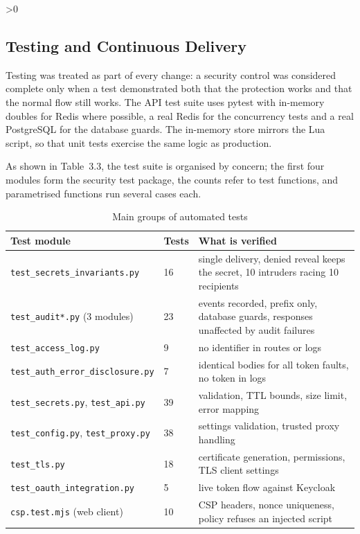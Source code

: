 \documentclass[12pt,a4paper]{article}
\numberwithin{equation}{section}
\numberwithin{figure}{section}
\numberwithin{table}{section}
\newcommand{\subsec}[1]{%
  \ifnum\value{subsection}>0\clearpage\fi
  \subsection{#1}%
}
\newcommand{\tablesetup}{\fontsize{11pt}{13pt}\selectfont\singlespacing\renewcommand{\arraystretch}{1.15}}
\newcommand{\leadin}[1]{%
  {\onehalfspacing\setlength{\parindent}{1.25cm}\indent #1\par}\vspace{8pt}}
\begin{document}
\subsec{Testing and Continuous Delivery}

Testing was treated as part of every change: a security control was considered complete only when a test demonstrated both that the protection works and that the normal flow still works. The API test suite uses pytest with in-memory doubles for Redis where possible, a real Redis for the concurrency tests and a real PostgreSQL for the database guards. The in-memory store mirrors the Lua script, so that unit tests exercise the same logic as production.

\begin{table}[H]
\leadin{As shown in Table~3.3, the test suite is organised by concern; the first four modules form the security test package, the counts refer to test functions, and parametrised functions run several cases each.}
\tablesetup
\caption{Main groups of automated tests}
\label{tab:tests}
\begin{tabularx}{\textwidth}{|P{0.43\textwidth}|P{0.07\textwidth}|L|}
\hline
\textbf{Test module} & \textbf{Tests} & \textbf{What is verified} \\ \hline
\nolinkurl{test_secrets_invariants.py} & 16 & single delivery, denied reveal keeps the secret, 10 intruders racing 10 recipients \\ \hline
\nolinkurl{test_audit*.py} (3 modules) & 23 & events recorded, prefix only, database guards, responses unaffected by audit failures \\ \hline
\nolinkurl{test_access_log.py} & 9 & no identifier in routes or logs \\ \hline
\nolinkurl{test_auth_error_disclosure.py} & 7 & identical bodies for all token faults, no token in logs \\ \hline
\nolinkurl{test_secrets.py}, \nolinkurl{test_api.py} & 39 & validation, TTL bounds, size limit, error mapping \\ \hline
\nolinkurl{test_config.py}, \nolinkurl{test_proxy.py} & 38 & settings validation, trusted proxy handling \\ \hline
\nolinkurl{test_tls.py} & 18 & certificate generation, permissions, TLS client settings \\ \hline
\nolinkurl{test_oauth_integration.py} & 5 & live token flow against Keycloak \\ \hline
\nolinkurl{csp.test.mjs} (web client) & 10 & CSP headers, nonce uniqueness, policy refuses an injected script \\ \hline
\end{tabularx}
\end{table}
\end{document}
